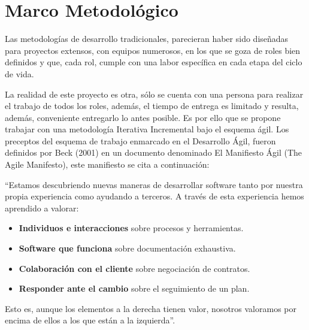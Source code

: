 \chapter{Marco Metodológico}
\label{chap:marcometodologico}

Las metodologías de desarrollo tradicionales, parecieran haber sido diseñadas para proyectos extensos, con equipos numerosos, en los que se goza de roles bien definidos y que, cada rol, cumple con una labor específica en cada etapa del ciclo de vida.

La realidad de este proyecto es otra, sólo se cuenta con una persona para realizar el trabajo de todos los roles, además, el tiempo de entrega es limitado y resulta, además, conveniente entregarlo lo antes posible. Es por ello que se propone trabajar con una metodología Iterativa Incremental bajo el esquema ágil. Los preceptos del esquema de trabajo enmarcado en el Desarrollo Ágil, fueron definidos por Beck (2001) en un documento denominado El Manifiesto Ágil (The Agile Manifesto), este manifiesto se cita a continuación:

``Estamos descubriendo nuevas maneras de desarrollar software tanto por nuestra propia experiencia como ayudando a terceros. A través de esta experiencia hemos aprendido a valorar:

\begin{itemize}
\item \textbf{Individuos e interacciones} sobre procesos y herramientas.
\item \textbf{Software que funciona} sobre documentación exhaustiva.
\item \textbf{Colaboración con el cliente} sobre negociación de contratos.
\item \textbf{Responder ante el cambio} sobre el seguimiento de un plan.
\end{itemize}

Esto es, aunque los elementos a la derecha tienen valor, nosotros valoramos por encima de ellos a los que están a la izquierda''.

